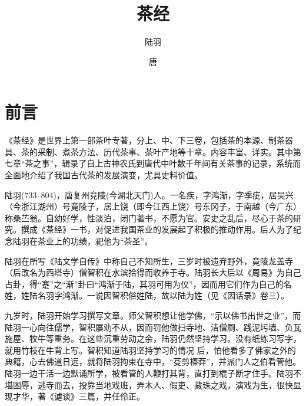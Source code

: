 \documentclass[12pt,UTF8]{ctexbook}
\title{\heiti\zihao{0} 茶经}
\author{陆羽}
\date{唐}
\begin{document}
\maketitle
\tableofcontents

\frontmatter

\chapter{前言}

《茶经》是世界上第一部茶叶专著，分上、中、下三卷，包括茶的本源、制茶器具、茶的采制、煮茶方法、历代茶事、茶叶产地等十章。内容丰富、详实。其中第七章“茶之事”，辑录了自上古神农氏到唐代中叶数千年间有关茶事的记录，系统而全面地介绍了我国古代茶的发展演变，尤具史料价值。　

陆羽(733--804)，唐复州竞陵(今湖北天门)人。一名疾，字鸿渐，字季疵，居吴兴（今浙江湖州）号竟陵子，居上饶（即今江西上饶）号东冈子，于南越（今广东）称桑苎翁。自幼好学，性淡泊，闭门著书，不愿为官。安史之乱后，尽心于茶的研究。撰成《茶经》一书，对促进我国茶业的发展起了积极的推动作用。后人为了纪念陆羽在茶业上的功绩，祀他为“茶圣”。

陆羽在所写《陆文学自传》中称自己不知所生，三岁时被遗弃野外，竟陵龙盖寺（后改名为西塔寺）僧智积在水滨拾得而收养于寺。陆羽长大后以《周易》为自己占卦，得“蹇”之“渐”卦曰“鸿渐于陆，其羽可用为仪”，因而用它们作为自己的名姓，姓陆名羽字鸿渐。一说因智积俗姓陆，故以陆为姓（见《因话录》卷三）。

九岁时，陆羽开始学习撰写文章。师父智积想让他学佛，“示以佛书出世之业”，而陆羽一心向往儒学，智积屡劝不从，因而罚他做扫寺地、洁僧厕、践泥圬墙、负瓦施屋、牧牛等重务。在这些沉重劳动之余，陆羽仍然坚持学习。没有纸练习写字，就用竹枝在牛背上写。智积知道陆羽坚持学习的情况
后，怕他看多了佛家之外的典籍，心去佛道日远，就将陆羽拘束在寺中，“芟剪榛莽”，并派门人之伯看管他。陆羽一边干活一边默诵所学，被看管的人鞭打其背，直打到棍子断才住手。陆羽不堪困辱，逃寺而去，投靠当地戏班，弄木人、假吏、藏珠之戏，演戏为生，很快显现才华，著《谑谈》三篇，并任伶正。
\end{document}
